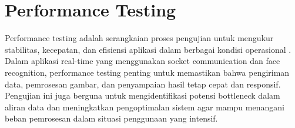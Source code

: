 \section{Performance Testing}
Performance testing adalah serangkaian proses pengujian untuk mengukur stabilitas, kecepatan, dan efisiensi aplikasi dalam berbagai kondisi operasional \cite{jinImpactExtensionsBrowser2024}. Dalam aplikasi real-time yang menggunakan socket communication dan face recognition, performance testing penting untuk memastikan bahwa pengiriman data, pemrosesan gambar, dan penyampaian hasil tetap cepat dan responsif. Pengujian ini juga berguna untuk mengidentifikasi potensi bottleneck dalam aliran data dan meningkatkan pengoptimalan sistem agar mampu menangani beban pemrosesan dalam situasi penggunaan yang intensif.
